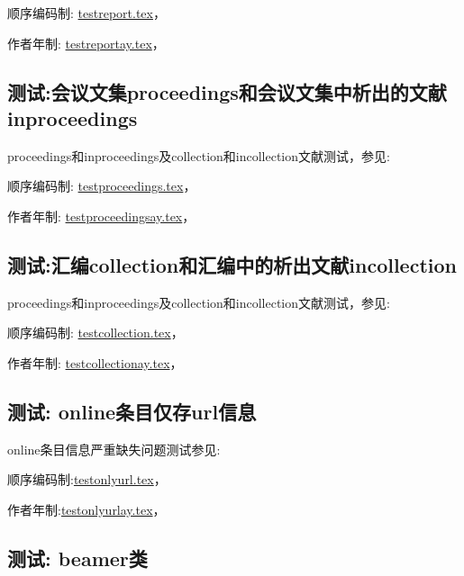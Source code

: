 顺序编码制:
\href{run:./example/testreport.tex}{testreport.tex}，

作者年制:
\href{run:./example/testreportay.tex}{testreportay.tex}，


\subsection{测试:会议文集proceedings和会议文集中析出的文献inproceedings}

proceedings和inproceedings及collection和incollection文献测试，参见:

顺序编码制:
\href{run:./example/testproceedings.tex}{testproceedings.tex}，

作者年制:
\href{run:./example/testproceedingsay.tex}{testproceedingsay.tex}，


\subsection{测试:汇编collection和汇编中的析出文献incollection}

proceedings和inproceedings及collection和incollection文献测试，参见:

顺序编码制:
\href{run:./example/testcollection.tex}{testcollection.tex}，

作者年制:
\href{run:./example/testcollectionay.tex}{testcollectionay.tex}，




\subsection{测试: online条目仅存url信息}
\label{sec:opt:noauthor}
online条目信息严重缺失问题测试参见:

顺序编码制:\href{run:./example/testonlyurl.tex}{testonlyurl.tex}，

作者年制:\href{run:./example/testonlyurlay.tex}{testonlyurlay.tex}，


\subsection{测试: beamer类}

